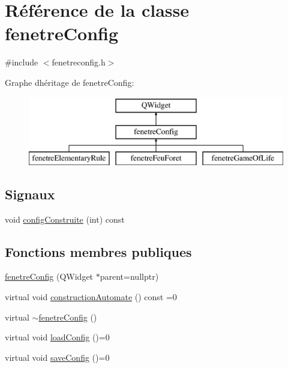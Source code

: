 \hypertarget{classfenetre_config}{}\section{Référence de la classe fenetre\+Config}
\label{classfenetre_config}


{\ttfamily \#include $<$fenetreconfig.\+h$>$}

Graphe d\textquotesingle{}héritage de fenetre\+Config\+:\begin{figure}[H]
\begin{center}
\leavevmode
\includegraphics[height=3.000000cm]{classfenetre_config}
\end{center}
\end{figure}
\subsection*{Signaux}
\begin{DoxyCompactItemize}
\item 
void \mbox{\hyperlink{classfenetre_config_a9bec5e0d532367badb669f28eb3cad0d}{config\+Construite}} (int) const
\end{DoxyCompactItemize}
\subsection*{Fonctions membres publiques}
\begin{DoxyCompactItemize}
\item 
\mbox{\hyperlink{classfenetre_config_ac1515d010b54334e6a6bd121d5756f35}{fenetre\+Config}} (Q\+Widget $\ast$parent=nullptr)
\item 
virtual void \mbox{\hyperlink{classfenetre_config_a67e3561304b9c53dc01ae3f3b3713c11}{construction\+Automate}} () const =0
\item 
virtual \mbox{\hyperlink{classfenetre_config_a84bee3769f0b8e5b38bc1f09449689e1}{$\sim$fenetre\+Config}} ()
\item 
virtual void \mbox{\hyperlink{classfenetre_config_afab21d3c10c4b7779614da983e1e9bd5}{load\+Config}} ()=0
\item 
virtual void \mbox{\hyperlink{classfenetre_config_a4bdf35ea6efe26c3e9b1cea487931ba1}{save\+Config}} ()=0
\end{DoxyCompactItemize}


